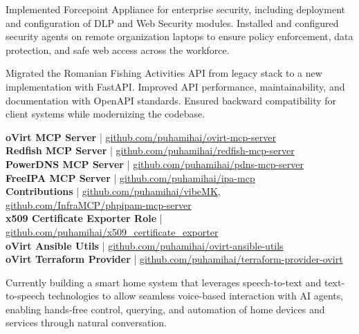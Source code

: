 \documentclass[10pt,a4paper,ragged2e,withhyper]{altacv}
\begin{document}
Implemented Forcepoint Appliance for enterprise security, including deployment and configuration of DLP and Web Security modules. Installed and configured security agents on remote organization laptops to ensure policy enforcement, data protection, and safe web access across the workforce.

Migrated the Romanian Fishing Activities API from legacy stack to a new implementation with FastAPI. Improved API performance, maintainability, and documentation with OpenAPI standards. Ensured backward compatibility for client systems while modernizing the codebase.


{\small
\textbf{oVirt MCP Server} \textcolor{PastelRed}{|} \href{https://github.com/puhamihai/ovirt-mcp-server}{github.com/puhamihai/ovirt-mcp-server}\\
\textbf{Redfish MCP Server} \textcolor{PastelRed}{|} \href{https://github.com/puhamihai/redfish-mcp-server}{github.com/puhamihai/redfish-mcp-server}\\
\textbf{PowerDNS MCP Server} \textcolor{PastelRed}{|} \href{https://github.com/puhamihai/pdns-mcp-server}{github.com/puhamihai/pdns-mcp-server}\\
\textbf{FreeIPA MCP Server} \textcolor{PastelRed}{|} \href{https://github.com/puhamihai/ipa-mcp}{github.com/puhamihai/ipa-mcp}\\
\textbf{Contributions} \textcolor{PastelRed}{|} \href{https://github.com/puhamihai/vibeMK}{github.com/puhamihai/vibeMK}, \href{https://github.com/InfraMCP/phpipam-mcp-server}{github.com/InfraMCP/phpipam-mcp-server}\\
\textbf{x509 Certificate Exporter Role} \textcolor{PastelRed}{|} \href{https://github.com/puhamihai/x509_certificate_exporter}{github.com/puhamihai/x509\_certificate\_exporter}\\
\textbf{oVirt Ansible Utils} \textcolor{PastelRed}{|} \href{https://github.com/puhamihai/ovirt-ansible-utils}{github.com/puhamihai/ovirt-ansible-utils}\\
\textbf{oVirt Terraform Provider} \textcolor{PastelRed}{|} \href{https://github.com/puhamihai/terraform-provider-ovirt}{github.com/puhamihai/terraform-provider-ovirt}
\par}

Currently building a smart home system that leverages speech-to-text and text-to-speech technologies to allow seamless voice-based interaction with AI agents, enabling hands-free control, querying, and automation of home devices and services through natural conversation.
\end{document}
